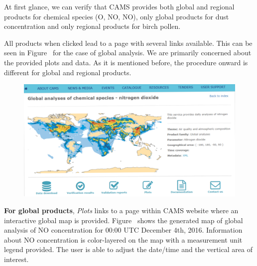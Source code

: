 \documentclass[9pt]{report}
\begin{document}
\noindent{}At first glance, we can verify that CAMS provides both global and regional products for chemical species (O, NO, NO), only global products for dust concentration and only regional products for birch pollen.%

All products when clicked lead to a page with several links available. This can be seen in Figure~ for the case of global analysis.
We are primarily concerned about the provided plots and data.
As it is mentioned before, the procedure onward is different for global and regional products.%

\begin{figure}[h!]%
\begin{mdcenter}%

\noindent{}\includegraphics[keepaspectratio=true,width=\dimmin{}{\dimwidth{0.90}}]{images/catalogue}{}%

\mdhr{}%

\noindent{}%
\end{mdcenter}\label{cams-catalogue}%
\end{figure}%

\noindent{}\textbf{For global products}, \emph{Plots} links to a page within CAMS website where an interactive global map is provided.
Figure~ shows the generated map of global analysis of NO concentration for 00:00 UTC December 4th, 2016.
Information about NO concentration is color-layered on the map with a measurement unit legend provided.
The user is able to adjust the date/time and the vertical area of interest.%
\end{document}

